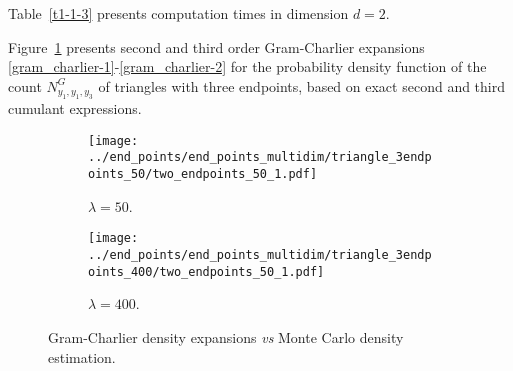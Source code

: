 \documentclass[12pt]{article}
\numberwithin{equation}{section}
\begin{document}
\vspace{-0.4cm}

\noindent
Table~\ref{t1-1-3} presents computation times in dimension $d=2$.
 
\vspace{-0.1cm}

\begin{table}[H] 
  \centering
\scriptsize %
{}
\caption{Computation times and counts of connected non-flat {\em vs} all partitions in $\Pi ([n]\times[3])$.}
\label{t1-1-3}
\end{table} 

\vspace{-0.4cm}

\noindent
 Figure~\ref{fig5} presents second and third order Gram-Charlier
 expansions \eqref{gram_charlier-1}-\eqref{gram_charlier-2} 
 for the probability density function of the
 count $N^G_{y_1,y_1,y_3}$ of triangles with three endpoints,
 based on exact second and third cumulant expressions. 
 
\begin{figure}[H]
\centering
\begin{subfigure}{.5\textwidth}
\centering
\texttt{[image: ../end\_points/end\_points\_multidim/triangle\_3endpoints\_50/two\_endpoints\_50\_1.pdf]} 
\vskip-0.08cm
\caption{\small $\lambda = 50$.} 
\end{subfigure}
\hskip-0.2cm
\begin{subfigure}{.5\textwidth}
\centering
\texttt{[image: ../end\_points/end\_points\_multidim/triangle\_3endpoints\_400/two\_endpoints\_50\_1.pdf]} 
\vskip-0.08cm
\caption{\small $\lambda = 400$.} 
\end{subfigure}
\vskip-0.16cm
\caption{\small Gram-Charlier density expansions {\em vs} Monte Carlo density estimation.} 
\label{fig5}
\end{figure}
\end{document}
